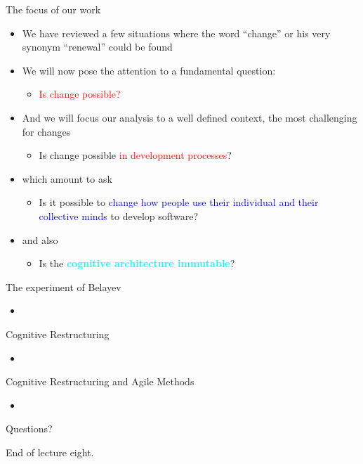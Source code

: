 \documentclass{beamer}
\begin{document}
\begin{frame}
{\centerline{The focus of our work}}


\begin{itemize}
\item We have reviewed a few situations where the word ``change'' or his very synonym ``renewal'' could be found
\item We will now pose the attention to a fundamental question:
\begin{itemize}
\item \textcolor{red}{Is change possible?}
\end{itemize} 
\item And we will focus our analysis to a well defined context, the most challenging for changes
\begin{itemize}
\item Is change possible \textcolor{red}{in development processes}?
\end{itemize} 
\item which amount to ask
\begin{itemize}
\item Is it possible to \textcolor{blue}{change how people use their individual and their collective minds} to develop software?
\end{itemize} 
\item and also
\begin{itemize}
\item Is the \textcolor{cyan}{\textbf{cognitive architecture immutable}}?
\end{itemize} 
\end{itemize} 

\end{frame}

\begin{frame}
{\centerline{The experiment of Belayev}}


\begin{itemize}
\item 
\end{itemize} 

\end{frame}

\begin{frame}
{\centerline{Cognitive Restructuring}}


\begin{itemize}
\item 
\end{itemize} 

\end{frame}

\begin{frame}
{\centerline{Cognitive Restructuring and Agile Methods}}


\begin{itemize}
\item 
\end{itemize} 

\end{frame}





\begin{frame}
{\centerline{Questions?}}
\vspace{1cm}
\begin{center}
    \LARGE{End of lecture eight.}
\end{center}

\end{frame}
\end{document}
